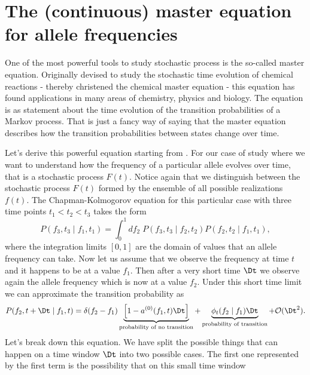 \section{The (continuous) master equation for allele frequencies}

One of the most powerful tools to study stochastic process is the so-called
master equation. Originally devised to study the stochastic time evolution of
chemical reactions - thereby christened the chemical master equation - this
equation has found applications in many areas of chemistry, physics and biology.
The equation is as statement about the time evolution of the transition
probabilities of a Markov process. That is just a fancy way of saying that the
master equation describes how the transition probabilities between states change
over time.

Let's derive this powerful equation starting from .
For our case of study where we want to understand how the frequency of a
particular allele evolves over time, that is a stochastic process $F(t)$. Notice
again that we distinguish between the stochastic process $F(t)$ formed by the
ensemble of all possible realizations $f(t)$. The Chapman-Kolmogorov equation
for this particular case with three time points $t_1 < t_2 < t_3$ takes the form
\begin{equation}
  P(f_3, t_3 \mid f_1, t_1) = \int_0^1 df_2\; P(f_3, t_3 \mid f_2, t_2)
                                          P(f_2, t_2 \mid f_1, t_1),
  \label{eq_chapman_freq}
\end{equation}
where the integration limits $[0, 1]$ are the domain of values that an allele
frequency can take. Now let us assume that we observe the frequency at time $t$
and it happens to be at a value $f_1$. Then after a very short time $\Dt$ we
observe again the allele frequency which is now at a value $f_2$. Under this
short time limit we can approximate the transition probability as
\begin{equation}
  P(f_2, t + \Dt \mid f_1, t) = \delta(f_2 - f_1)
  \underbrace{\left[ 1 - a^{(0)}(f_1, t) \Dt \right]}_{\text{probability
  of no transition}} +
  \underbrace{\phi_t(f_2 \mid f_1)\Dt}_\text{probability of transition} +
  \mathcal{O}(\Dt^2).
  \label{eq_transition_short_time}
\end{equation}
Let's break down this equation. We have split the possible things that can
happen on a time window $\Dt$ into two possible cases. The first one
represented by the first term is the possibility that on this small time window
